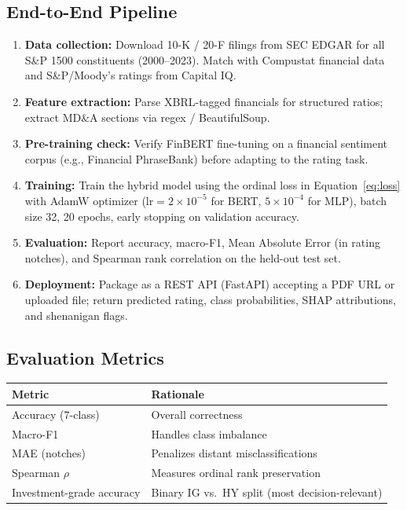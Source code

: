 \documentclass[12pt, a4paper]{article}
\begin{document}
\subsection{End-to-End Pipeline}

\begin{enumerate}
  \item \textbf{Data collection:} Download 10-K / 20-F filings from SEC EDGAR for all S\&P 1500 constituents (2000–2023).  Match with Compustat financial data and S\&P/Moody's ratings from Capital IQ.
  \item \textbf{Feature extraction:} Parse XBRL-tagged financials for structured ratios; extract MD\&A sections via regex / BeautifulSoup.
  \item \textbf{Pre-training check:} Verify FinBERT fine-tuning on a financial sentiment corpus (e.g., Financial PhraseBank) before adapting to the rating task.
  \item \textbf{Training:} Train the hybrid model using the ordinal loss in Equation~\eqref{eq:loss} with AdamW optimizer ($\text{lr} = 2 \times 10^{-5}$ for BERT, $5 \times 10^{-4}$ for MLP), batch size 32, 20 epochs, early stopping on validation accuracy.
  \item \textbf{Evaluation:} Report accuracy, macro-F1, Mean Absolute Error (in rating notches), and Spearman rank correlation on the held-out test set.
  \item \textbf{Deployment:} Package as a REST API (FastAPI) accepting a PDF URL or uploaded file; return predicted rating, class probabilities, SHAP attributions, and shenanigan flags.
\end{enumerate}

\subsection{Evaluation Metrics}

\begin{center}
\begin{tabular}{l l}
  \toprule
  \textbf{Metric} & \textbf{Rationale} \\
  \midrule
  Accuracy (7-class)       & Overall correctness \\
  Macro-F1                 & Handles class imbalance \\
  MAE (notches)            & Penalizes distant misclassifications \\
  Spearman $\rho$          & Measures ordinal rank preservation \\
  Investment-grade accuracy & Binary IG vs.\ HY split (most decision-relevant) \\
  \bottomrule
\end{tabular}
\end{center}
\end{document}
